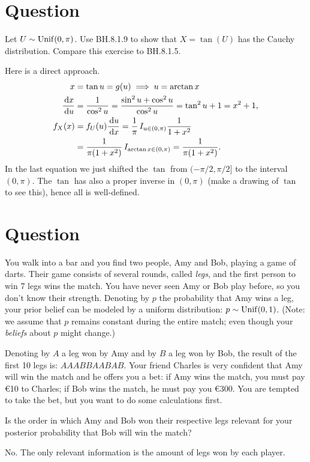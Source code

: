 \section*{Question}

\begin{exercise}
Let $U \sim  \mathrm{Unif}(0, \pi)$.
Use  BH.8.1.9 to show that $X = \tan(U)$ has the Cauchy distribution. Compare this exercise to BH.8.1.5.
\begin{solution}
Here is a direct approach.
  \begin{align}
    \label{eq:20}
x&=\tan u = g(u) \implies u = \arctan x\\
\frac{\,\textrm{d}x}{\,\textrm{d}u } &= \frac{1}{\cos^{2} u} = \frac{\sin^{2}u + \cos^{2}u }{\cos^{2}u} = \tan^{2} u + 1 = x^{2} + 1,\\
f_{X}(x) &= f_{U}(u) \frac{\,\textrm{d}u}{\,\textrm{d}x} = \frac{1}{\pi}\,I_{u\in (0, \pi)} \frac{1}{1+x^{2}} \\
&=\frac{1}{\pi(1+x^{2})}\,I_{\arctan x \in (0, \pi)} =\frac{1}{\pi(1+x^{2})}.
  \end{align}
  In the last equation we just shifted the $\tan$ from $(-\pi/2, \pi/2]$ to the interval $(0, \pi)$.
  The $\tan$ has also a proper inverse in $(0,\pi)$ (make a drawing of $\tan$ to see this), hence all is well-defined.
\end{solution}
\end{exercise}

\section*{Question}

You walk into a bar and you find two people, Amy and Bob, playing a game of darts. Their game consists of several rounds, called \textit{legs}, and the first person to win 7 legs wins the match. You have never seen Amy or Bob play before, so you don't know their strength. Denoting by $p$ the probability that Amy wins a leg, your prior belief can be modeled by a uniform distribution: $p \sim \mathrm{Unif}(0,1)$.  (Note: we assume that $p$ remains constant during the entire match; even though your \textit{beliefs} about $p$ might change.)

Denoting by $A$ a leg won by Amy and by $B$ a leg won by Bob, the result of the first 10 legs is: $AAABBAABAB$. Your friend Charles is very confident that Amy will win the match and he offers you a bet: if Amy wins the match, you must pay €10 to Charles; if Bob wins the match, he must pay you €300. You are tempted to take the bet, but you want to do some calculations first.
\begin{exercise}
Is the order in which Amy and Bob won their respective legs relevant for your posterior probability that Bob will win the match?
\begin{solution}
No. The only relevant information is the amount of legs won by each player.
\end{solution}
\end{exercise}

